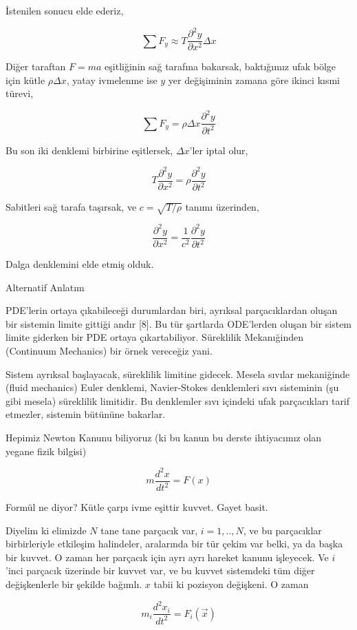 \documentclass[12pt,fleqn]{article}\usepackage{../../common}
\begin{document}
İstenilen sonucu elde ederiz, 

$$
\sum F_y \approx T \frac{\partial^2 y}{\partial x^2} \Delta x
$$

Diğer taraftan $F=ma$ eşitliğinin sağ tarafına bakarsak, baktığımız ufak bölge
için kütle $\rho\Delta x$, yatay ivmelenme ise $y$ yer değişiminin zamana göre
ikinci kısmi türevi,

$$
\sum F_y = \rho \Delta x \frac{\partial^2 y}{\partial t^2}
$$

Bu son iki denklemi birbirine eşitlersek, $\Delta x$'ler iptal olur, 

$$
T \frac{\partial^2 y}{\partial x^2}  =
\rho \frac{\partial^2 y}{\partial t^2}
$$

Sabitleri sağ tarafa taşırsak, ve $c = \sqrt{T / \rho}$ tanımı üzerinden,

$$
\frac{\partial^2 y}{\partial x^2}  =
\frac{1}{c^2}\frac{\partial^2 y}{\partial t^2}
$$

Dalga denklemini elde etmiş olduk.

Alternatif Anlatım

PDE'lerin ortaya çıkabileceği durumlardan biri, ayrıksal parçacıklardan oluşan
bir sistemin limite gittiği andır [8]. Bu tür şartlarda ODE'lerden oluşan bir
sistem limite giderken bir PDE ortaya çıkartabiliyor. Süreklilik Mekanığinden
(Continuum Mechanics) bir örnek vereceğiz yani.

Sistem ayrıksal başlayacak, süreklilik limitine gidecek. Mesela sıvılar
mekaniğinde (fluid mechanics) Euler denklemi, Navier-Stokes denklemleri sıvı
sisteminin (şu gibi mesela) süreklilik limitidir. Bu denklemler sıvı içindeki
ufak parçacıkları tarif etmezler, sistemin bütününe bakarlar.

Hepimiz Newton Kanunu biliyoruz (ki bu kanun bu derste ihtiyacımız olan
yegane fizik bilgisi)

$$ m \frac{d^2x}{dt^2} = F(x) $$

Formül ne diyor? Kütle çarpı ivme eşittir kuvvet. Gayet basit.

Diyelim ki elimizde $N$ tane tane parçacık var, $i=1,..,N$, ve bu
parçacıklar birbirleriyle etkileşim halindeler, aralarında bir tür çekim
var belki, ya da başka bir kuvvet. O zaman her parçacık için ayrı ayrı
hareket kanunu işleyecek. Ve $i$'inci parçacık üzerinde bir kuvvet var, ve
bu kuvvet sistemdeki tüm diğer değişkenlerle bir şekilde bağımlı. $x$ tabii
ki pozisyon değişkeni. O zaman

$$ m_i \frac{d^2x_i}{dt^2} = F_i(\vec{x}) $$
\end{document}
